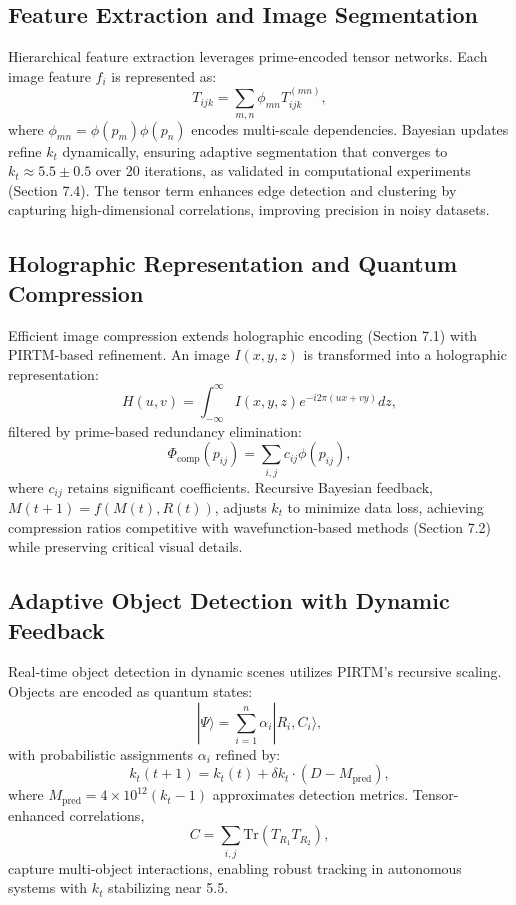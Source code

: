 \documentclass{article}
\theoremstyle{plain}
\begin{document}
\subsection{Feature Extraction and Image Segmentation}
Hierarchical feature extraction leverages prime-encoded tensor networks. Each image feature \( f_i \) is represented as:
\begin{equation}
    T_{ijk} = \sum_{m,n} \phi_{mn} T_{ijk}^{(mn)},
\end{equation}
where \( \phi_{mn} = \phi(p_m) \phi(p_n) \) encodes multi-scale dependencies. Bayesian updates refine \( k_t \) dynamically, ensuring adaptive segmentation that converges to \( k_t \approx 5.5 \pm 0.5 \) over 20 iterations, as validated in computational experiments (Section 7.4). The tensor term enhances edge detection and clustering by capturing high-dimensional correlations, improving precision in noisy datasets.

\subsection{Holographic Representation and Quantum Compression}
Efficient image compression extends holographic encoding (Section 7.1) with PIRTM-based refinement. An image \( I(x, y, z) \) is transformed into a holographic representation:
\begin{equation}
    H(u, v) = \int_{-\infty}^{\infty} I(x, y, z) e^{-i 2\pi (ux + vy)} dz,
\end{equation}
filtered by prime-based redundancy elimination:
\begin{equation}
    \Phi_{\text{comp}}(p_{ij}) = \sum_{i,j} c_{ij} \phi(p_{ij}),
\end{equation}
where \( c_{ij} \) retains significant coefficients. Recursive Bayesian feedback, \( M(t+1) = f(M(t), R(t)) \), adjusts \( k_t \) to minimize data loss, achieving compression ratios competitive with wavefunction-based methods (Section 7.2) while preserving critical visual details.

\subsection{Adaptive Object Detection with Dynamic Feedback}
Real-time object detection in dynamic scenes utilizes PIRTM’s recursive scaling. Objects are encoded as quantum states:
\begin{equation}
    |\Psi\rangle = \sum_{i=1}^n \alpha_i |R_i, C_i\rangle,
\end{equation}
with probabilistic assignments \( \alpha_i \) refined by:
\begin{equation}
    k_t(t+1) = k_t(t) + \delta k_t \cdot (D - M_{\text{pred}}),
\end{equation}
where \( M_{\text{pred}} = 4 \times 10^{12} (k_t - 1) \) approximates detection metrics. Tensor-enhanced correlations,
\begin{equation}
    C = \sum_{i,j} \text{Tr}(T_{R_1} T_{R_2}),
\end{equation}
capture multi-object interactions, enabling robust tracking in autonomous systems with \( k_t \) stabilizing near 5.5.
\end{document}
